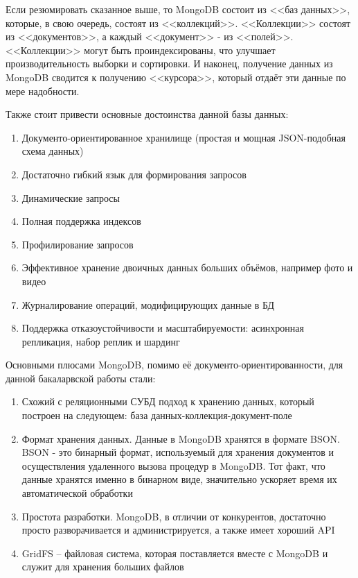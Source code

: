 \documentclass[14pt]{extreport}
\begin{document}
Если резюмировать сказанное выше, то MongoDB состоит из <<баз данных>>, которые, в свою очередь, состоят из <<коллекций>>. <<Коллекции>> состоят из <<документов>>, а каждый <<документ>> - из <<полей>>. <<Коллекции>> могут быть проиндексированы, что улучшает производительность выборки и сортировки. И наконец, получение данных из MongoDB сводится к получению <<курсора>>, который отдаёт эти данные по мере надобности.

Также стоит привести основные достоинства данной базы данных:

\begin{enumerate}

\item Документо-ориентированное хранилище (простая и мощная JSON-подобная схема данных)
\item Достаточно гибкий язык для формирования запросов
\item Динамические запросы
\item Полная поддержка индексов
\item Профилирование запросов
\item Эффективное хранение двоичных данных больших объёмов, например фото и видео
\item Журналирование операций, модифицирующих данные в БД
\item Поддержка отказоустойчивости и масштабируемости: асинхронная репликация, набор реплик и шардинг

\end{enumerate}

Основными плюсами MongoDB, помимо её документо-ориентированности, для данной бакаларвской работы стали:

\begin{enumerate}

\item Схожий с реляционными СУБД подход к хранению данных, который построен на следующем: база данных-коллекция-документ-поле

\item Формат хранения данных. Данные в MongoDB хранятся в формате BSON. BSON - это бинарный формат, используемый для хранения документов и осуществления удаленного вызова процедур в MongoDB. Тот факт, что данные хранятся именно в бинарном виде, значительно ускоряет время их автоматической обработки

\item Простота разработки. MongoDB, в отличии от конкурентов, достаточно просто разворачивается и администрируется, а также имеет хороший API 

\item GridFS -- файловая система, которая поставляется вместе с MongoDB и служит для хранения больших файлов

\end{enumerate}
\end{document}
